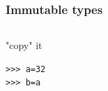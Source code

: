 \documentclass[colorlinks]{beamer}
\begin{document}
{

\begin{frame}[fragile]\frametitle{Immutable types}
\begin{columns}[T]
\begin{block}{"copy" it}
\begin{verbatim}
>>> a=32
>>> b=a
\end{verbatim}

\end{block}
\end{columns}

\end{frame}
}
\end{document}
